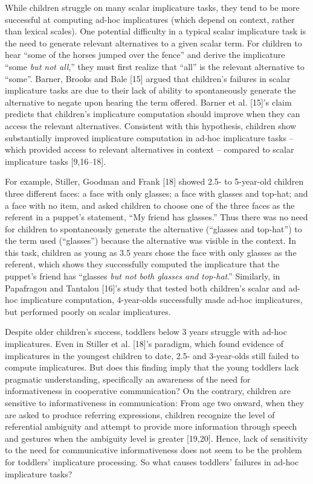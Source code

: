 \documentclass{rsos}
\begin{document}
While children struggle on many scalar implicature tasks, they tend to
be more successful at computing ad-hoc implicatures (which depend on
context, rather than lexical scales). One potential difficulty in a
typical scalar implicature task is the need to generate relevant
alternatives to a given scalar term. For children to hear ``some of the
horses jumped over the fence'' and derive the implicature ``some
\emph{but not all},'' they must first realize that ``all'' is the
relevant alternative to ``some''. Barner, Brooks and Bale {[}15{]} argued that children's
failures in scalar implicature tasks are due to their lack of ability to
spontaneously generate the alternative to negate upon hearing the term
offered. Barner et al. {[}15{]}'s claim predicts that children's implicature
computation should improve when they can access the relevant
alternatives. Consistent with this hypothesis, children show
substantially improved implicature computation in ad-hoc implicature
tasks -- which provided access to relevant alternatives in context --
compared to scalar implicature tasks {[}9,16--18{]}.

For example, Stiller, Goodman and Frank {[}18{]} showed 2.5- to 5-year-old children three different
faces: a face with only glasses; a face with glasses and top-hat; and a
face with no item, and asked children to choose one of the three faces
as the referent in a puppet's statement, ``My friend has glasses.'' Thus
there was no need for children to spontaneously generate the alternative
(``glasses and top-hat'') to the term used (``glasses'') because the
alternative was visible in the context. In this task, children as young
as 3.5 years chose the face with only glasses as the referent, which
shows they successfully computed the implicature that the puppet's
friend has ``glasses \emph{but not both glasses and top-hat}.''
Similarly, in Papafragou and Tantalou {[}16{]}'s study that tested both children's scalar and
ad-hoc implicature computation, 4-year-olds successfully made ad-hoc
implicatures, but performed poorly on scalar implicatures.

Despite older children's success, toddlers below 3 years struggle with
ad-hoc implicatures. Even in Stiller et al. {[}18{]}'s paradigm, which found evidence
of implicatures in the youngest children to date, 2.5- and 3-year-olds
still failed to compute implicatures. But does this finding imply that
the young toddlers lack pragmatic understanding, specifically an
awareness of the need for informativeness in cooperative communication?
On the contrary, children are sensitive to informativeness in
communication: From age two onward, when they are asked to produce
referring expressions, children recognize the level of referential
ambiguity and attempt to provide more information through speech and
gestures when the ambiguity level is greater {[}19,20{]}. Hence, lack of
sensitivity to the need for communicative informativeness does not seem
to be the problem for toddlers' implicature processing. So what causes
toddlers' failures in ad-hoc implicature tasks?
\end{document}
